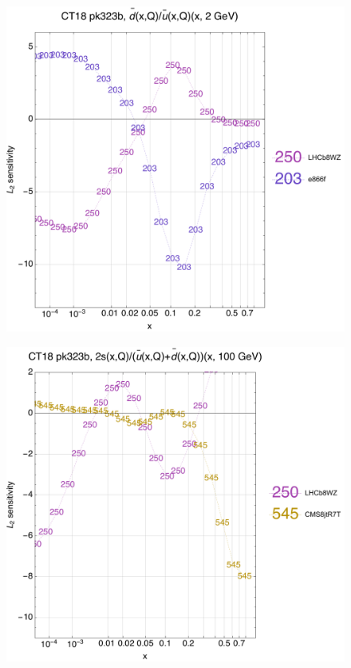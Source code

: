 \documentclass[10pt,aps,prd,floatfix,titlepage]{revtex4}
\begin{document}
\begin{figure}
\includegraphics[width=\textwidth,height=0.44\textheight,keepaspectratio]{2/rat_ifl4_ct18nn_L2_q2_Sf_2.pdf}
\caption{}
\end{figure}
\clearpage
\begin{figure}
\includegraphics[width=\textwidth,height=0.44\textheight,keepaspectratio]{2/rat_ifl5_ct18nn_L2_q100_Sf_2.pdf}
\caption{}
\end{figure}
\end{document}
